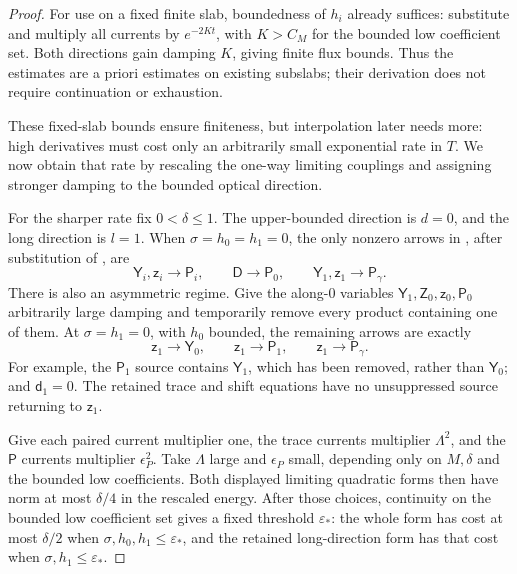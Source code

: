 \begin{proof}
For use on a fixed finite slab, boundedness of $h_i$ already suffices:
substitute  and multiply all currents by
$e^{-2Kt}$, with $K>C_M$ for the bounded low coefficient set.
Both directions gain damping $K$, giving finite flux bounds.
Thus the estimates are a priori estimates on existing subslabs;
their derivation does not require continuation or exhaustion.

These fixed-slab bounds ensure finiteness, but interpolation later needs
more: high derivatives must cost only an arbitrarily small exponential
rate in $T$. We now obtain that rate by rescaling the one-way limiting
couplings and assigning stronger damping to the bounded optical direction.

For the sharper rate fix $0<\delta\le1$.  The upper-bounded direction
is $d=0$, and the long direction is $l=1$.  When
$\sigma=h_0=h_1=0$, the only nonzero arrows in
, after substitution of
, are
\[
 \mathsf Y_i,\mathsf z_i\longrightarrow\mathsf P_i,
 \qquad \mathsf D\longrightarrow\mathsf P_0,
 \qquad \mathsf Y_1,\mathsf z_1\longrightarrow\mathsf P_\gamma.
\]
There is also an asymmetric regime.  Give the along-$0$ variables
$\mathsf Y_1,\mathsf Z_0,\mathsf z_0,\mathsf P_0$ arbitrarily
large damping and temporarily remove every product containing one
of them.  At $\sigma=h_1=0$, with $h_0$ bounded, the remaining
arrows are exactly
\[
 \mathsf z_1\longrightarrow\mathsf Y_0,
 \qquad\mathsf z_1\longrightarrow\mathsf P_1,
 \qquad\mathsf z_1\longrightarrow\mathsf P_\gamma.
\]
For example, the $\mathsf P_1$ source contains
$\mathsf Y_1$, which has been removed, rather than $\mathsf Y_0$;
and $\mathsf d_1=0$.  The retained trace and shift equations have
no unsuppressed source returning to $\mathsf z_1$.

Give each paired current multiplier one, the trace currents
multiplier $\Lambda^2$, and the $\mathsf P$ currents multiplier
$\epsilon_P^2$.  Take $\Lambda$ large and $\epsilon_P$ small,
depending only on $M,\delta$ and the bounded low coefficients.
Both displayed limiting quadratic forms then have norm at most
$\delta/4$ in the rescaled energy.  After those choices, continuity
on the bounded low coefficient set gives a fixed threshold
$\varepsilon_*$: the whole form has cost at most $\delta/2$ when
$\sigma,h_0,h_1\le\varepsilon_*$, and the retained long-direction
form has that cost when $\sigma,h_1\le\varepsilon_*$.


\end{proof}
